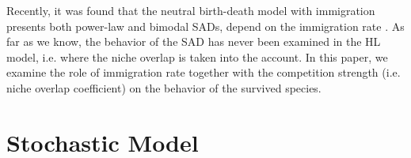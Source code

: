 \documentclass[%
 amsmath,amssymb,
 reprint,%
]{revtex4-2}
\begin{document}
Recently, it was found that the neutral birth-death model with immigration presents both power-law and bimodal SADs, depend on the immigration rate \cite{xu2018immigration}. As far as we know, the behavior of the SAD  has never been examined in the HL model, i.e. where the niche overlap is taken into the account. 
In this paper, we examine the role of immigration rate together with the competition strength (i.e. niche overlap coefficient) on the behavior of the survived species.  



\section{Stochastic Model}
\end{document}
